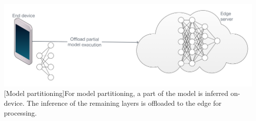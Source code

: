 \begin{minipage}[t]{\linewidth}    
	\centering
	\includegraphics[width=\linewidth]{figures/models/partitioning}
	[Model partitioning]{For model partitioning, a part of the model is inferred on-device. The inference of the remaining layers is offloaded to the edge for processing.}
	\label{fig:offlaoding}
\end{minipage}

